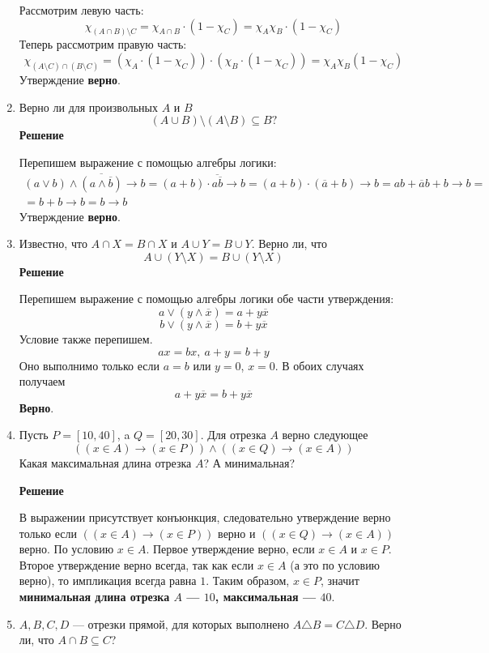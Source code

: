 \documentclass[12pt]{article}
\begin{document}
\begin{enumerate}[label={\textbf{\arabic{section}.\arabic*}}]
		Рассмотрим левую часть:
		$$
		\chi_{(A\cap B)\setminus C} = \chi_{A\cap B}\cdot(1-\chi_C) = \chi_A\chi_B\cdot(1-\chi_C)
		$$
		Теперь рассмотрим правую часть:
		$$
		\chi_{(A\setminus C)\cap (B\setminus C)} = (\chi_A\cdot(1 - \chi_C))\cdot(\chi_B\cdot(1 - \chi_C)) = \chi_A\chi_B(1-\chi_C)
		$$
		Утверждение \textbf{верно}.
		\item Верно ли для произвольных $A$ и $B$
		$$
		(A\cup B)\setminus (A\setminus B)\subseteq B?
		$$
		\textbf{Решение}
		
		Перепишем выражение с помощью алгебры логики:
		\begin{multline*}
			(a\vee b)\wedge\overline{(a\wedge\overline{b})}\rightarrow b = (a+b)\cdot\overline{a\overline{b}} \rightarrow b = (a+b)\cdot(\overline{a}+b) \rightarrow b = ab + \overline{a}b + b \rightarrow b = \\
			= b + b \rightarrow b = b \rightarrow b
		\end{multline*}
		Утверждение \textbf{верно}.
		\item Известно, что $A\cap X = B\cap X$ и $A\cup Y = B\cup Y$. Верно ли, что
		$$
		A\cup (Y\setminus X) = B\cup(Y\setminus X)
		$$
		\textbf{Решение}
		
		Перепишем выражение с помощью алгебры логики обе части утверждения:
		$$
		a\vee(y\wedge\overline{x}) = a + y\overline{x}
		$$
		$$
		b\vee(y\wedge\overline{x}) = b + y\overline{x}
		$$
		Условие также перепишем.
		$$
		ax = bx,~ a+y = b+y
		$$
		Оно выполнимо только если $a = b$ или $y=0$, $x=0$. В обоих случаях получаем
		$$
		a + y\overline{x} = b + y\overline{x}
		$$
		\textbf{Верно}.
		\item Пусть $P = [10, 40]$, a $Q = [20,30]$. Для отрезка $A$ верно следующее 
		$$
		((x\in A)\rightarrow(x\in P))\wedge((x\in Q)\rightarrow(x\in A))
		$$		
		Какая максимальная длина отрезка $A$? А минимальная?
		
		\textbf{Решение}
		
		В выражении  присутствует конъюнкция, следовательно утверждение верно только если $((x\in A)\rightarrow(x\in P))$ верно и $((x\in Q)\rightarrow(x\in A))$ верно. 
		По условию $x\in A$. Первое утверждение верно, если $x\in A$ и $x\in P$. Второе утверждение верно всегда, так как если $x\in A$ (а это по условию верно), то импликация всегда равна $1$. Таким образом, $x\in P$, значит \textbf{минимальная длина отрезка $A$ --- $10$, максимальная --- $40$}.
		\item  $A, B, C, D$ --- отрезки прямой, для которых выполнено $A\triangle B = C\triangle D$. Верно ли, что $A\cap B\subseteq C$?
		

\end{enumerate}
\end{document}
